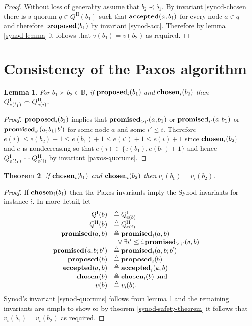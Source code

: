 \documentclass[journal]{IEEEtran}
\newtheorem{theorem}{Theorem}
\newtheorem{lemma}[theorem]{Lemma}
\begin{document}
\begin{proof} Without loss of generality assume that ${b_2 \prec b_1}$. By
invariant \ref{synod-chosen} there is a quorum $q \in Q^\textrm{II}(b_1)$ such
that $\mathbf{accepted}_{}(a,b_1)$ for every node $a \in q$ and therefore $\mathbf{proposed}_{}(b_1)$ by
invariant \ref{synod-acc}.  Therefore by lemma \ref{synod-lemma} it follows
that $v(b_1) = v(b_2)$ as required.  \end{proof}

\section{Consistency of the Paxos algorithm}\label{paxos-invariants}

\begin{lemma}\label{paxos-synod-quorum-invariant} For $b_1 \succ b_2 \in
\mathbb B$, if $\mathbf{proposed}_{i}(b_1)$ and $\mathbf{chosen}_{i}(b_2)$ then
${{Q}^\textrm{I}_{e(b_1)} \frown {Q}^\textrm{II}_{e(i)}}$.  \end{lemma}

\begin{proof} $\mathbf{proposed}_{i}(b_1)$ implies that $\mathbf{promised}_{\ge i'}(a,b_1)$ or
$\mathbf{promised}_{i'}(a,b_1)$ or $\mathbf{promised}_{i'}(a,b_1;b')$ for some node $a$ and some $i'
\le i$. Therefore $e(i) \le e(b_2) + 1 \le e(b_1) + 1 \le e(i') + 1 \le e(i) +
1$ since $\mathbf{chosen}_{i}(b_2)$ and $e$ is nondecreasing so that $e(i) \in \{
e(b_1), e(b_1) + 1 \}$ and hence ${{Q}^\textrm{I}_{e(b_1)} \frown {Q}^\textrm{II}_{e(i)}}$ by invariant
\ref{paxos-quorums}.  \end{proof}

\begin{theorem}\label{paxos-safety-theorem} If $\mathbf{chosen}_{i}(b_1)$ and
$\mathbf{chosen}_{i}(b_2)$ then ${v_i(b_1) = v_i(b_2)}$.  \end{theorem}

\begin{proof} If $\mathbf{chosen}_{i}(b_1)$ then the Paxos invariants imply the Synod
invariants for instance $i$.  In more detail, let
\[\begin{array}{rl}
Q^\textrm{I}(b) &\triangleq {Q}^\textrm{I}_{e(b)} \\
Q^\textrm{II}(b) &\triangleq {Q}^\textrm{II}_{e(i)} \\
\mathbf{promised}_{}(a,b) &\triangleq \mathbf{promised}_{i}(a,b) \\
& \ {}\vee \exists i' \le i. \mathbf{promised}_{\ge i'}(a,b) \\
\mathbf{promised}_{}(a,b;b') &\triangleq \mathbf{promised}_{i}(a,b;b') \\
\mathbf{proposed}_{}(b) &\triangleq \mathbf{proposed}_{i}(b) \\
\mathbf{accepted}_{}(a,b) &\triangleq \mathbf{accepted}_{i}(a,b) \\
\mathbf{chosen}_{}(b) &\triangleq \mathbf{chosen}_{i}(b) \textrm{ and} \\
v(b) &\triangleq v_i(b) .\\
\end{array}
\]
Synod's invariant \ref{synod-quorums} follows from lemma
\ref{paxos-synod-quorum-invariant} and the remaining invariants are simple to
show so by theorem \ref{synod-safety-theorem} it follows that $v_i(b_1) =
v_i(b_2)$ as required.  \end{proof}
\end{document}
